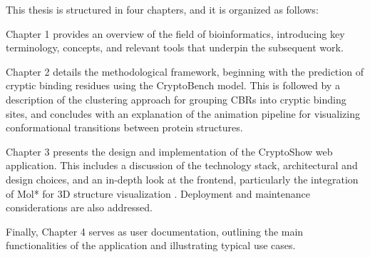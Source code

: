 This thesis is structured in four chapters, and it is organized as follows:

Chapter 1 provides an overview of the field of bioinformatics, introducing key terminology, concepts, and relevant tools that underpin the subsequent work.

Chapter 2 details the methodological framework, beginning with the prediction of cryptic binding residues using the CryptoBench model. This is followed by a description of the clustering approach for grouping CBRs into cryptic binding sites, and concludes with an explanation of the animation pipeline for visualizing conformational transitions between protein structures.

Chapter 3 presents the design and implementation of the CryptoShow web application. This includes a discussion of the technology stack, architectural and design choices, and an in-depth look at the frontend, particularly the integration of Mol* for 3D structure visualization \cite{sehnal2021mol}. Deployment and maintenance considerations are also addressed.

Finally, Chapter 4 serves as user documentation, outlining the main functionalities of the application and illustrating typical use cases.
